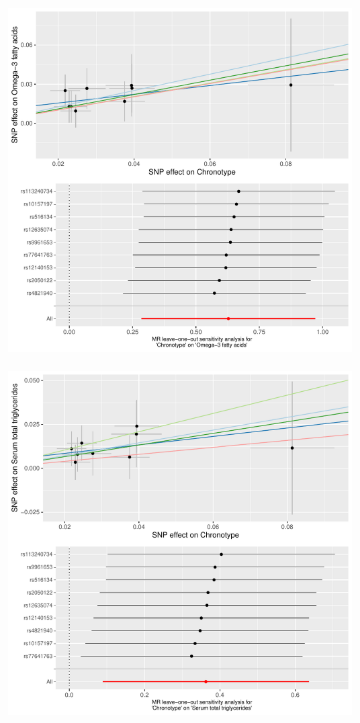 \documentclass[journal,article,submit,moreauthors,pdftex]{Definitions/mdpi}
\begin{document}
\begin{figure}[htbp]
     \centering
     \begin{subfigure}[b]{0.4\textwidth}
         \centering
         \includegraphics[width=\textwidth]{Figs/Analysis2/Chronotype_vs_Omega-3_fatty_acids.Plots.pdf}
         \caption{}
         \label{omega3}
     \end{subfigure}
     \begin{subfigure}[b]{0.4\textwidth}
         \centering
         \includegraphics[width=\textwidth]{Figs/Analysis2/Chronotype_vs_Serum_total_triglycerides.Plots.pdf}

\end{subfigure}
\end{figure}
\end{document}
